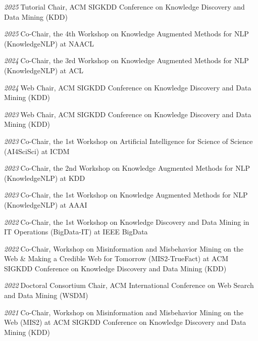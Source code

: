 \documentclass[10pt]{article}
\newenvironment{myindentpar}[1]%
{\begin{list}{}%
         {\setlength{\leftmargin}{#1}}%
         \item[]%
}
{\end{list}}
\newcounter{list}
\begin{document}
\begin{myindentpar}{0.75cm}
{\hspace{-0.75cm}\textit{2025}\textcolor{white}{.}Tutorial Chair, ACM SIGKDD Conference on Knowledge Discovery and Data Mining (KDD)

\hspace{-0.75cm}\textit{2025}\textcolor{white}{.}Co-Chair, the 4th Workshop on Knowledge Augmented Methods for NLP (KnowledgeNLP) at NAACL

\hspace{-0.75cm}\textit{2024}\textcolor{white}{.}Co-Chair, the 3rd Workshop on Knowledge Augmented Methods for NLP (KnowledgeNLP) at ACL

\hspace{-0.75cm}\textit{2024}\textcolor{white}{.}Web Chair, ACM SIGKDD Conference on Knowledge Discovery and Data Mining (KDD)

\hspace{-0.75cm}\textit{2023}\textcolor{white}{.}Web Chair, ACM SIGKDD Conference on Knowledge Discovery and Data Mining (KDD)

\hspace{-0.75cm}\textit{2023}\textcolor{white}{.}Co-Chair, the 1st Workshop on Artificial Intelligence for Science of Science (AI4SciSci) at ICDM

\hspace{-0.75cm}\textit{2023}\textcolor{white}{.}Co-Chair, the 2nd Workshop on Knowledge Augmented Methods for NLP (KnowledgeNLP) at KDD

\hspace{-0.75cm}\textit{2023}\textcolor{white}{.}Co-Chair, the 1st Workshop on Knowledge Augmented Methods for NLP (KnowledgeNLP) at AAAI

\hspace{-0.75cm}\textit{2022}\textcolor{white}{.}Co-Chair, the 1st Workshop on Knowledge Discovery and Data Mining in IT Operations (BigData-IT) at IEEE BigData

\hspace{-0.75cm}\textit{2022}\textcolor{white}{.}Co-Chair, Workshop on Misinformation and Misbehavior Mining on the Web \& Making a Credible Web for Tomorrow (MIS2-TrueFact) at ACM SIGKDD Conference on Knowledge Discovery and Data Mining (KDD)

\hspace{-0.75cm}\textit{2022}\textcolor{white}{.}Doctoral Consortium Chair, ACM International Conference on Web Search and Data Mining (WSDM)

\hspace{-0.75cm}\textit{2021}\textcolor{white}{.}Co-Chair, Workshop on Misinformation and Misbehavior Mining on the Web (MIS2) at ACM SIGKDD Conference on Knowledge Discovery and Data Mining (KDD)

}
\end{myindentpar}
\end{document}
